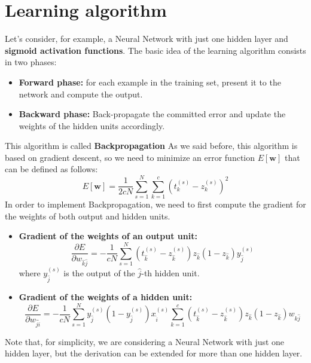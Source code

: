 \section{Learning algorithm}
Let's consider, for example, a Neural Network with just one hidden layer and \textbf{sigmoid activation functions}. The basic idea of the learning algorithm consists in two phases:
\begin{itemize}
    \item \textbf{Forward phase:} for each example in the training set, present it to the network and compute the output.
    \item \textbf{Backward phase:} Back-propagate the committed error and update the weights of the hidden units accordingly. 
\end{itemize}
This algorithm is called \textbf{Backpropagation}\newline\newline
As we said before, this algorithm is based on gradient descent, so we need to minimize an error function $E[\textbf{w}]$ that can be defined as follows:
\[E[\textbf{w}] = \frac{1}{2cN}\sum_{s=1}^{N}\sum_{k=1}^{c}(t_{k}^{(s)} - z_{k}^{(s)})^{2}\]
In order to implement Backpropagation, we need to first compute the gradient for the weights of both output and hidden units.
\begin{itemize}
    \item \textbf{Gradient of the weights of an output unit:}
    \[\frac{\partial E}{\partial w_{\hat{k}\hat{j}}} = - \frac{1}{cN}\sum_{s=1}^{N}(t_{\hat{k}}^{(s)} - z_{\hat{k}}^{(s)} )z_{\hat{k}}(1 - z_{\hat{k}})y_{\hat{j}}^{(s)}\]
    where $y_{\hat{j}}^{(s)}$ is the output of the $\hat{j}$-th hidden unit.
    
    \item \textbf{Gradient of the weights of a hidden unit:}
    \[\frac{\partial E}{\partial w_{\hat{j}\hat{i}}} = - \frac{1}{cN}\sum_{s=1}^{N}y_{\hat{j}}^{(s)}(1 - y_{\hat{j}}^{(s)})x_{\hat{i}}^{(s)}\sum_{k=1}^{c}(t_{\hat{k}}^{(s)} - z_{\hat{k}}^{(s)} )z_{\hat{k}}(1 - z_{\hat{k}})w_{k\hat{j}}\]
\end{itemize}
Note that, for simplicity, we are considering a Neural Network with just one hidden layer, but the derivation can be extended for more than one hidden layer.
